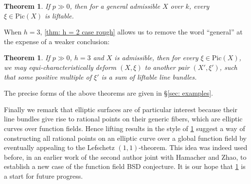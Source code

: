 \documentclass[letter, 11pt]{article}
\theoremstyle{plain}
\newtheorem{theorem}[subsubsection]{Theorem}
\theoremstyle{definition}
\newcommand{\IP}{\mathbb{P}}
\newcommand{\<}{\langle}
\renewcommand{\>}{\rangle}
\newcommand{\Pic}{\mathrm{Pic}}
\begin{document}
\begin{theorem}
\label{thm: elliptic in intro}
    If $p \gg 0$, then for a general admissible $X$ over $k$, every $\xi \in \Pic(X)$ is liftable.
\end{theorem}

\noindent When $h = 3$, \ref{thm: h = 2 case rough} allows us to remove the word ``general'' at the expense of a weaker conclusion: 

\begin{theorem}
    If $p \gg 0$, $h = 3$ and $X$ is admissible, then for every $\xi \in \Pic(X)$, we may equi-characteristically deform $(X, \xi)$ to another pair $(X', \xi')$, such that some positive multiple of $\xi'$ is a sum of liftable line bundles.
\end{theorem}

The precise forms of the above theorems are given in \S\ref{sec: examples}.  

Finally we remark that elliptic surfaces are of particular interest because their line bundles give rise to rational points on their generic fibers, which are elliptic curves over function fields. Hence lifting results in the style of \ref{thm: elliptic in intro} suggest a way of constructing all rational points on an elliptic curve over a global function field by eventually appealing to the Lefschetz $(1, 1)$-theorem. This idea was indeed used before, in an earlier work of the second author \cite{HYZ} joint with Hamacher and Zhao, to establish a new case of the function field BSD conjecture. It is our hope that \ref{thm: elliptic in intro} is a start for future progress.
\end{document}

